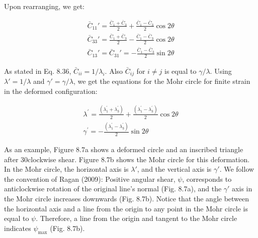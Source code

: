 \documentclass[a4paper , 12pt]{book}
\begin{document}
Upon rearranging, we get:

\begin{equation}
    \begin{gathered}
        \bar{C}_{11}'=\frac{\bar{C}_1+\bar{C}_3}{2}+\frac{\bar{C}_1-\bar{C}_3}{2}\cos 2\theta  \\
        \bar{C}_{33}'=\frac{\bar{C}_1+\bar{C}_3}{2}-\frac{\bar{C}_1-\bar{C}_3}{2}\cos 2\theta \\
        \bar{C}_{13}'=\bar{C}_{31}'=-\frac{\bar{C}_1-\bar{C}_3}{2}\sin 2\theta
    \end{gathered}
\end{equation}

As stated in Eq. 8.36, $\bar{C}_{ii} = 1/\lambda_i$. Also $\bar{C}_{ij}$ for $i \neq j$ is equal to $\gamma / \lambda$. Using $\lambda ' = 1/\lambda$ and $\gamma ' = \gamma / \lambda$, we get the equations for the Mohr circle for finite strain in the deformed configuration:

\begin{equation}
    \begin{gathered}
        \lambda^{\prime}=\frac{\left(\lambda_{1}^{\prime}+\lambda_{3}^{\prime}\right)}{2}+\frac{\left(\lambda_{1}^{\prime}-\lambda_{3}^{\prime}\right)}{2} \cos 2 \theta  \\
        \gamma^{\prime}=-\frac{\left(\lambda_{1}^{\prime}-\lambda_{3}^{\prime}\right)}{2} \sin 2 \theta
    \end{gathered}
\end{equation}

As an example, Figure 8.7a shows a deformed circle and an inscribed triangle after 30\degree\space clockwise shear. Figure 8.7b shows the Mohr circle for this deformation. In the Mohr circle, the horizontal axis is $\lambda'$, and the vertical axis is $\gamma'$. We follow the convention of Ragan (2009): Positive angular shear, $\psi$, corresponds to anticlockwise rotation of the original line's normal (Fig. 8.7a), and the $\gamma'$ axis in the Mohr circle increases downwards (Fig. 8.7b). Notice that the angle between the horizontal axis and a line from the origin to any point in the Mohr circle is equal to $\psi$. Therefore, a line from the origin and tangent to the Mohr circle indicates $\psi_{\text{max}}$ (Fig. 8.7b).
\end{document}
